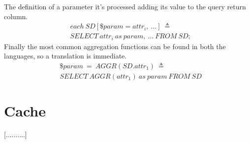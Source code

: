 The definition of a parameter it's processed adding its value to the query return column.
\begin{align*}%
&each\ SD[\$param = attr_i,\ \ldots]\ \triangleq\\
&SELECT\ attr_i\ as\ param,\ \ldots\ FROM\ SD;
\end{align*}
Finally the most common aggregation functions can be found in both the languages, so a translation is immediate.
\begin{align*}%
&\$param\ =\ AGGR(SD.attr_1)\ \triangleq\\
&SELECT\ AGGR(attr_1)\ as\ param\ FROM\ SD
\end{align*}

\section{Cache}

[..........]